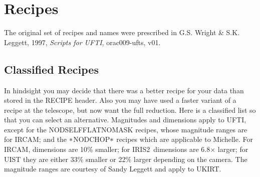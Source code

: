 \documentclass[twoside,11pt]{article}
\newcommand{\htmladdnormallink}[2]{#1}
\newcommand{\xlabel}[1]{}
\renewcommand{\_}{\texttt{\symbol{95}}}
\newcommand{\lsk}{\raisebox{-0.4ex}{\rm *}}
\newcommand{\IRCAM}{\htmladdnormallink{IRCAM}{http://www.jach.hawaii.edu/JACpublic/UKIRT/instruments/ircam/ircam3.html}}
\newcommand{\IRIS}{\htmladdnormallink{IRIS2}{http://www.aao.gov.au/iris2/}}
\newcommand{\Michelle}{\htmladdnormallink{Michelle}{http://www.jach.hawaii.edu/JACpublic/UKIRT/instruments/michelle/michelle.html}}
\begin{document}
\newpage
\section{\xlabel{recipes}Recipes\label{recipes}}

The original set of recipes and names were prescribed in
G.S. Wright \& S.K. Leggett, 1997, {\em Scripts for UFTI}, 
\htmladdnormallink{orac009-ufts, v01}
{http://www.jach.hawaii.edu/JACpublic/UKIRT/software/orac/docs/orac009-ufts-1.html}.

\subsection{\xlabel{classified_recipes}Classified Recipes}

In hindsight you may decide that there was a better recipe for your
data than stored in the RECIPE header.  Also you may have used a
faster variant of a recipe at the telescope, but now want the full
reduction.  Here is a classified list so that you can select an
alternative.  Magnitudes and dimensions apply to UFTI, except for the
NOD\_SELF\_FLAT\_NO\_MASK recipes, whose magnitude ranges are for
IRCAM; and the $\lsk$NOD\_CHOP$\lsk$ recipes which are applicable to
\Michelle.  For \IRCAM, dimensions are 10\% smaller; for \IRIS\ dimensions
are 6.8$\times$ larger; for UIST they are either 33\% smaller or 22\%
larger depending on the camera.  The magnitude ranges are courtesy of Sandy Leggett
and apply to UKIRT.
\bigskip\bigskip\bigskip\bigskip\bigskip\bigskip\bigskip\bigskip\bigskip\bigskip\bigskip
\end{document}
